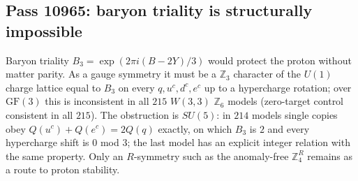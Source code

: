 \subsection{Pass 10965: baryon triality is structurally impossible}

Baryon triality $B_3=\exp(2\pi i(B-2Y)/3)$ would protect the proton without matter parity.
As a gauge symmetry it must be a $\mathbb{Z}_3$ character of the $U(1)$ charge lattice equal to
$B_3$ on every $q,u^c,d^c,e^c$ up to a hypercharge rotation; over $\mathrm{GF}(3)$ this is
inconsistent in all $215$ $W(3,3)$ $\mathbb{Z}_6$ models (zero-target control consistent in all
$215$).  The obstruction is $SU(5)$: in $214$ models single copies obey
$Q(u^c)+Q(e^c)=2Q(q)$ exactly, on which $B_3$ is $2$ and every hypercharge shift is $0$ mod $3$;
the last model has an explicit integer relation with the same property.  Only an
$R$-symmetry such as the anomaly-free $\mathbb{Z}_4^R$ remains as a route to proton stability.
